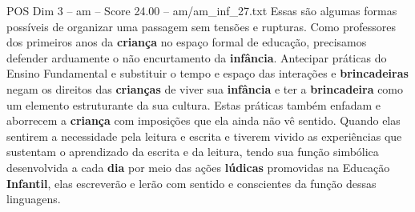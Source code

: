 \begin{textsample}{POS Dim 3 – am – Score 24.00 – am/am\_inf\_27.txt}
Essas são algumas formas possíveis de organizar uma passagem sem tensões e rupturas.
Como professores dos primeiros anos da \textbf{criança} no espaço formal de educação, precisamos defender arduamente o não encurtamento da \textbf{infância}.
Antecipar práticas do Ensino Fundamental e substituir o tempo e espaço das interações e \textbf{brincadeiras} negam os direitos das \textbf{crianças} de viver sua \textbf{infância} e ter a \textbf{brincadeira} como um elemento estruturante da sua cultura.
Estas práticas também enfadam e aborrecem a \textbf{criança} com imposições que ela ainda não vê sentido.
Quando elas sentirem a necessidade pela leitura e escrita e tiverem vivido as experiências que sustentam o aprendizado da escrita e da leitura, tendo sua função simbólica desenvolvida a cada \textbf{dia} por meio das ações \textbf{lúdicas} promovidas na Educação \textbf{Infantil}, elas escreverão e lerão com sentido e conscientes da função dessas linguagens.

\end{textsample}
